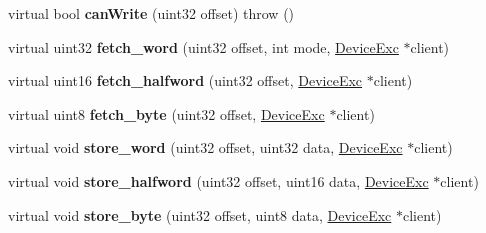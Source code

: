 \begin{DoxyCompactItemize}
\item 
\hypertarget{classRange_aff1be6b26b1c8e4d2b9da3aed0047f61}{
virtual bool {\bfseries canWrite} (uint32 offset)  throw ()}
\label{classRange_aff1be6b26b1c8e4d2b9da3aed0047f61}

\item 
\hypertarget{classRange_a28e79e890739dd67a6c23bf0f7c02af9}{
virtual uint32 {\bfseries fetch\_\-word} (uint32 offset, int mode, \hyperlink{classDeviceExc}{DeviceExc} $\ast$client)}
\label{classRange_a28e79e890739dd67a6c23bf0f7c02af9}

\item 
\hypertarget{classRange_a50db2c6c72990ee650848a1c1fa4fec6}{
virtual uint16 {\bfseries fetch\_\-halfword} (uint32 offset, \hyperlink{classDeviceExc}{DeviceExc} $\ast$client)}
\label{classRange_a50db2c6c72990ee650848a1c1fa4fec6}

\item 
\hypertarget{classRange_af1c0d52a57febea4a3028bdaa09e30f1}{
virtual uint8 {\bfseries fetch\_\-byte} (uint32 offset, \hyperlink{classDeviceExc}{DeviceExc} $\ast$client)}
\label{classRange_af1c0d52a57febea4a3028bdaa09e30f1}

\item 
\hypertarget{classRange_ae39949a0fa25f9496279f8af55ba941a}{
virtual void {\bfseries store\_\-word} (uint32 offset, uint32 data, \hyperlink{classDeviceExc}{DeviceExc} $\ast$client)}
\label{classRange_ae39949a0fa25f9496279f8af55ba941a}

\item 
\hypertarget{classRange_ad2b6650ff9971e2dd21f401008b445ca}{
virtual void {\bfseries store\_\-halfword} (uint32 offset, uint16 data, \hyperlink{classDeviceExc}{DeviceExc} $\ast$client)}
\label{classRange_ad2b6650ff9971e2dd21f401008b445ca}

\item 
\hypertarget{classRange_ac33096c6c3db8aad007facc14f5c0617}{
virtual void {\bfseries store\_\-byte} (uint32 offset, uint8 data, \hyperlink{classDeviceExc}{DeviceExc} $\ast$client)}
\label{classRange_ac33096c6c3db8aad007facc14f5c0617}

\end{DoxyCompactItemize}
